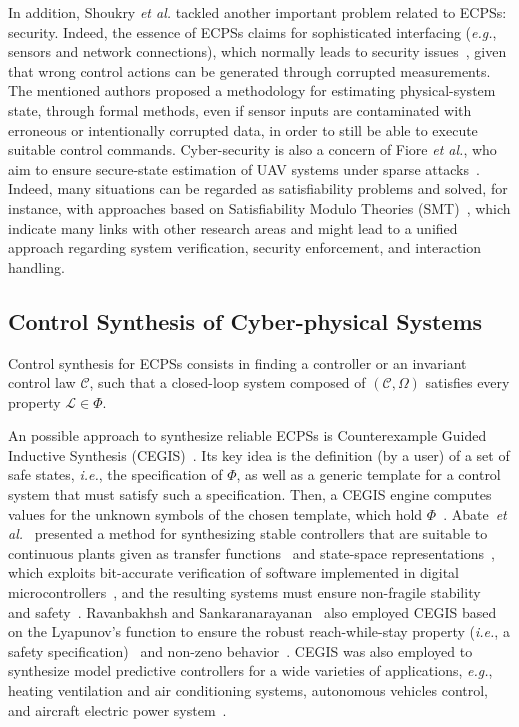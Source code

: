 \documentclass[format=acmsmall, review=false, screen=true]{acmart}
\begin{document}
In addition, Shoukry {\it et al.} \cite{Shoukry} tackled another important problem related to ECPSs: security. Indeed, the essence of ECPSs claims for sophisticated interfacing ({\it e.g.}, sensors and network connections), which normally leads to security issues~\cite{cpsattack}, given that wrong control actions can be generated through corrupted measurements. The mentioned authors proposed a methodology for estimating physical-system state, through formal methods, even if sensor inputs are contaminated with erroneous or intentionally corrupted data, in order to still be able to execute suitable control commands. Cyber-security is also a concern of Fiore {\it et al.}, who aim to ensure secure-state estimation of UAV systems under sparse attacks~\cite{Fiore17}. Indeed, many situations can be regarded as satisfiability problems and solved, for instance, with approaches based on Satisfiability Modulo Theories (SMT)~\cite{Araujo16,TrindadeDAES2016,Rahman13}, which indicate many links with other research areas and might lead to a unified approach regarding system verification, security enforcement, and interaction handling.

\subsection{Control Synthesis of Cyber-physical Systems}
\label{ssec:synthesis}

Control synthesis for ECPSs consists in finding a controller or an invariant control law $\mathcal{C}$, such that a closed-loop system composed of $(\mathcal{C},\Omega)$ satisfies every property $\mathcal{L}\in \Phi$. 

An possible approach to synthesize reliable ECPSs is Counterexample Guided Inductive Synthesis (CEGIS)~\cite{DBLP:conf/asplos/Solar-LezamaTBSS06}. Its key idea is the definition (by a user) of a set of safe states, {\it i.e.}, the specification of $\Phi$, as well as a generic template for a control system that must satisfy such a specification. Then, a CEGIS engine computes values for the unknown symbols of the chosen template, which hold $\Phi$~\cite{RienerKFB16}. Abate~{\it et al.}~\cite{Abate17,abatecav2017} presented a method for synthesizing stable controllers that are suitable to continuous plants given as transfer functions~\cite{Abate17} and state-space representations~\cite{abatecav2017}, which exploits bit-accurate verification of software implemented in digital microcontrollers~\cite{Bessa16,Bessa17,dsv_spin2015}, and the resulting systems must ensure non-fragile stability~\cite{Abate17} and safety~\cite{abatecav2017}. Ravanbakhsh and Sankaranarayanan~\cite{Ravanbakhsh15,Ravanbakhsh16} also employed CEGIS based on the Lyapunov's function to ensure the robust reach-while-stay property ({\it i.e.}, a safety specification)~\cite{Ravanbakhsh16} and non-zeno behavior~\cite{Ravanbakhsh15}. CEGIS was also employed to synthesize model predictive controllers for a wide varieties of applications, {\it e.g.}, heating ventilation and air conditioning systems, autonomous vehicles control, and aircraft electric power system~\cite{Ghosh05,Rahman13}.
\end{document}
